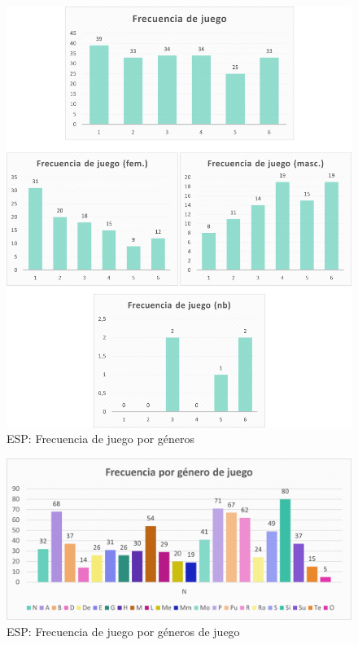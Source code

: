 \documentclass[12pt, a4paper,twoside,titlepage]{book}
\begin{document}
\begin{figure}
    \centering
    \includegraphics[width=1\linewidth]{ANEXO ESP/3AnexGENFrecALL}
    \caption{ESP: Frecuencia de juego por géneros}
    \label{fig:ESPFrec}
\end{figure}



\begin{figure}
    \centering
    \includegraphics[width=1\linewidth]{ANEXO ESP/4AnexESPFrecgne}
    \caption{ESP: Frecuencia de juego por géneros de juego}
    \label{fig:ESPFrecgen}
\end{figure}
\end{document}
